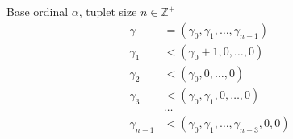 \documentclass{article}
\begin{document}
Base ordinal $\alpha$, tuplet size $n \in \mathbb{Z}^+$ \\
\begin{align*}
  \gamma &= (\gamma_0, \gamma_1, \ldots, \gamma_{n-1}) \\
  \gamma_1 &< (\gamma_0+1, 0, \ldots, 0) \\
  \gamma_2 &< (\gamma_0, 0, \ldots, 0) \\
  \gamma_3 &< (\gamma_0, \gamma_1, 0, \ldots, 0) \\
  &\ldots \\
  \gamma_{n-1} &< (\gamma_0, \gamma_1, \ldots, \gamma_{n-3}, 0, 0)
\end{align*}
\end{document}
